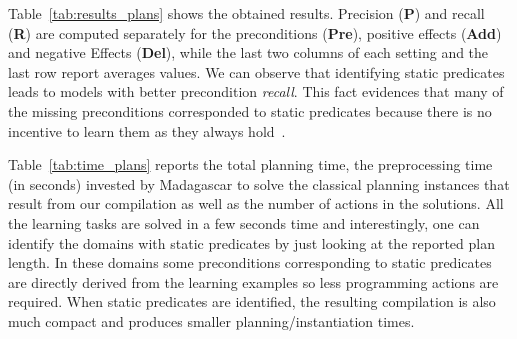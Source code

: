 \documentclass[letterpaper]{article} %
\begin{document}
Table~\ref{tab:results_plans} shows the obtained results. Precision ({\bf P}) and recall ({\bf R}) are computed separately for the preconditions ({\bf Pre}), positive effects ({\bf Add}) and negative Effects ({\bf Del}), while the last two columns of each setting and the last row report averages values. We can observe that identifying static predicates leads to models with better precondition {\em recall}. This fact evidences that many of the missing preconditions corresponded to static predicates because there is no incentive to learn them as they always hold~\cite{gregory2015domain}.

Table~\ref{tab:time_plans} reports the total planning time, the preprocessing time (in seconds) invested by {\sc Madagascar} to solve the classical planning instances that result from our compilation as well as the number of actions in the solutions. All the learning tasks are solved in a few seconds time and interestingly, one can identify the domains with static predicates by just looking at the reported plan length. In these domains some preconditions corresponding to static predicates are directly derived from the learning examples so less programming actions are required. When static predicates are identified, the resulting compilation is also much compact and produces smaller planning/instantiation times.
\end{document}
